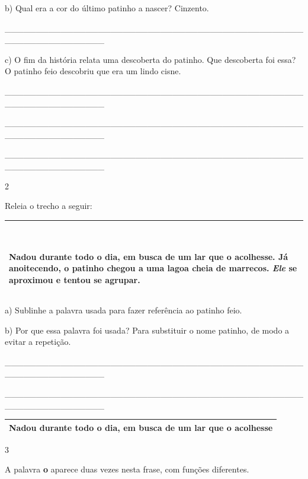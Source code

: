 \begin{itemize}
{{{\begin{itemize}
\begin{itemize}
\begin{itemize}
b) Qual era a cor do último patinho a nascer? Cinzento.

\_\_\_\_\_\_\_\_\_\_\_\_\_\_\_\_\_\_\_\_\_\_\_\_\_\_\_\_\_\_\_\_\_\_\_\_\_\_\_\_\_\_\_\_\_\_\_\_\_\_\_\_\_\_\_\_\_\_\_\_\_\_\_\_

c) O fim da história relata uma descoberta do patinho. Que descoberta
foi essa? O patinho feio descobriu que era um lindo cisne.

\_\_\_\_\_\_\_\_\_\_\_\_\_\_\_\_\_\_\_\_\_\_\_\_\_\_\_\_\_\_\_\_\_\_\_\_\_\_\_\_\_\_\_\_\_\_\_\_\_\_\_\_\_\_\_\_\_\_\_\_\_\_\_\_

\protect\hypertarget{_Hlk130128820}{}{}\_\_\_\_\_\_\_\_\_\_\_\_\_\_\_\_\_\_\_\_\_\_\_\_\_\_\_\_\_\_\_\_\_\_\_\_\_\_\_\_\_\_\_\_\_\_\_\_\_\_\_\_\_\_\_\_\_\_\_\_\_\_\_\_

\_\_\_\_\_\_\_\_\_\_\_\_\_\_\_\_\_\_\_\_\_\_\_\_\_\_\_\_\_\_\_\_\_\_\_\_\_\_\_\_\_\_\_\_\_\_\_\_\_\_\_\_\_\_\_\_\_\_\_\_\_\_\_\_

\num{2}

Releia o trecho a seguir:

\begin{longtable}[]{@{}l@{}}
\toprule
\begin{minipage}[t]{0.97\columnwidth}\raggedright\strut
~ ~

Nadou durante todo o dia, em busca de um lar que o acolhesse. Já
anoitecendo, o patinho chegou a uma lagoa cheia de marrecos. \emph{Ele}
se aproximou e tentou se agrupar.\strut
\end{minipage}\tabularnewline
\bottomrule
\end{longtable}

a) Sublinhe a palavra usada para fazer referência ao patinho feio.

b) Por que essa palavra foi usada? Para substituir o nome patinho, de
modo a evitar a repetição.

\_\_\_\_\_\_\_\_\_\_\_\_\_\_\_\_\_\_\_\_\_\_\_\_\_\_\_\_\_\_\_\_\_\_\_\_\_\_\_\_\_\_\_\_\_\_\_\_\_\_\_\_\_\_\_\_\_\_\_\_\_\_\_\_

\_\_\_\_\_\_\_\_\_\_\_\_\_\_\_\_\_\_\_\_\_\_\_\_\_\_\_\_\_\_\_\_\_\_\_\_\_\_\_\_\_\_\_\_\_\_\_\_\_\_\_\_\_\_\_\_\_\_\_\_\_\_\_\_

\begin{longtable}[]{@{}l@{}}
\toprule
Nadou durante todo o dia, em busca de um lar que o
acolhesse\tabularnewline
\bottomrule
\end{longtable}

\num{3}

A palavra \textbf{o} aparece duas vezes nesta frase, com funções
diferentes.


\end{itemize}
\end{itemize}
\end{itemize}}}}
\end{itemize}
